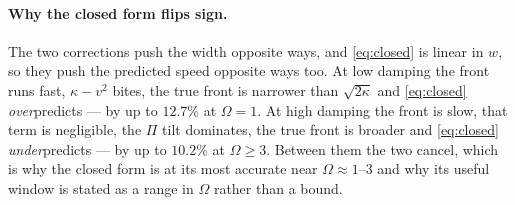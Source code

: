 \paragraph{Why the closed form flips sign.} The two corrections push the width
opposite ways, and \eqref{eq:closed} is linear in $w$, so they push the predicted
speed opposite ways too. At low damping the front runs fast, $\kappa - v^2$ bites,
the true front is narrower than $\sqrt{2\kappa}$ and \eqref{eq:closed}
\emph{over}predicts --- by up to $12.7\%$ at $\Omega = 1$. At high damping the
front is slow, that term is negligible, the $\Pi$ tilt dominates, the true front
is broader and \eqref{eq:closed} \emph{under}predicts --- by up to $10.2\%$ at
$\Omega \ge 3$. Between them the two cancel, which is why the closed form is at
its most accurate near $\Omega \approx 1$--$3$ and why its useful window is
stated as a range in $\Omega$ rather than a bound.
